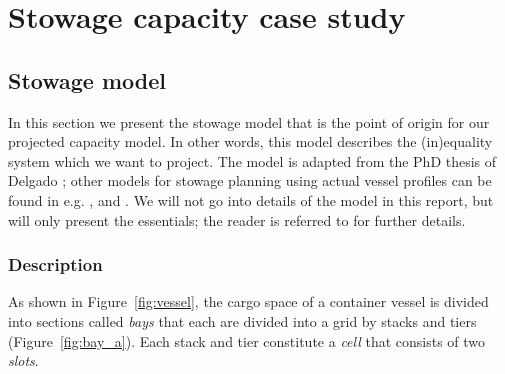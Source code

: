 \section{Stowage capacity case study}\label{sec:results}
\subsection{Stowage model}
In this section we present the stowage model that is the point of origin for our projected capacity model. In other words, this model describes the (in)equality system which we want to project. The model is adapted from the PhD thesis of Delgado \cite{AlbertosThesis}; other models for stowage planning using actual vessel profiles can be found in e.g. \cite{DariosThesis}, \cite{pacino11} and \cite{pacino12}. We will not go into details of the model in this report, but will only present the essentials; the reader is referred to \cite{AlbertosThesis} %
for further details. 
%
\subsubsection*{Description}
As shown in Figure~\ref{fig:vessel}, the cargo space of a container vessel is divided into
sections called \textit{bays} that each are divided into a grid by stacks and tiers (Figure~\ref{fig:bay_a}). Each stack and tier constitute a \emph{cell} that consists of two \emph{slots}. 

